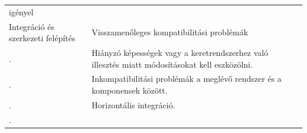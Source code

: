 \documentclass[12pt,magyar,a4paper,oneside]{scrreprt}
\begin{document}
\begin{longtable}[]{@{}lll@{}}
\begin{minipage}[t]{0.49\columnwidth}
igényel\strut
\end{minipage} & \begin{minipage}[t]{0.18\columnwidth}\raggedright
\strut
\end{minipage}\tabularnewline
\begin{minipage}[t]{0.24\columnwidth}\raggedright
Integráció és szerkezeti felépítés\strut
\end{minipage} & \begin{minipage}[t]{0.49\columnwidth}\raggedright
Visszamenőleges kompatibilitási problémák\strut
\end{minipage} & \begin{minipage}[t]{0.18\columnwidth}\raggedright
\strut
\end{minipage}\tabularnewline
\begin{minipage}[t]{0.24\columnwidth}\raggedright
.\strut
\end{minipage} & \begin{minipage}[t]{0.49\columnwidth}\raggedright
Hiányzó képességek vagy a keretrendszerhez való illesztés miatt
módosításokat kell eszközölni.\strut
\end{minipage} & \begin{minipage}[t]{0.18\columnwidth}\raggedright
\strut
\end{minipage}\tabularnewline
\begin{minipage}[t]{0.24\columnwidth}\raggedright
.\strut
\end{minipage} & \begin{minipage}[t]{0.49\columnwidth}\raggedright
Inkompatibilitási problémák a meglévő rendszer és a komponensek
között.\strut
\end{minipage} & \begin{minipage}[t]{0.18\columnwidth}\raggedright
\strut
\end{minipage}\tabularnewline
\begin{minipage}[t]{0.24\columnwidth}\raggedright
.\strut
\end{minipage} & \begin{minipage}[t]{0.49\columnwidth}\raggedright
Horizontális integráció.\strut
\end{minipage} & \begin{minipage}[t]{0.18\columnwidth}\raggedright
\strut
\end{minipage}\tabularnewline
\begin{minipage}[t]{0.24\columnwidth}\raggedright
.\strut
\end{minipage} & \begin{minipage}[t]{0.49\columnwidth}\raggedright

\end{minipage}
\end{longtable}
\end{document}

